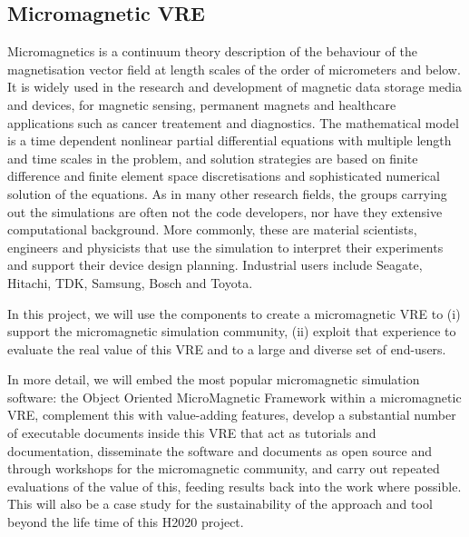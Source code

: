\subsection{Micromagnetic VRE}
Micromagnetics is a continuum theory description of the behaviour of
the magnetisation vector field at length scales of the order of
micrometers and below. It is widely used in the research and
development of magnetic data storage media and devices, for magnetic
sensing, permanent magnets and healthcare applications such as cancer
treatement and diagnostics. The mathematical model is a time dependent
nonlinear partial differential equations with multiple length and time
scales in the problem, and solution strategies are based on finite
difference and finite element space discretisations and sophisticated
numerical solution of the equations. As in many other research fields,
the groups carrying out the simulations are often not the code
developers, nor have they extensive computational background. More
commonly, these are material scientists, engineers and physicists that
use the simulation to interpret their experiments and support their
device design planning. Industrial users include Seagate, Hitachi,
TDK, Samsung, Bosch and Toyota.

In this project, we will use the \TheProject components to create a
micromagnetic VRE to (i) support the micromagnetic simulation
community, (ii) exploit that experience to evaluate the real value of
this VRE and \TheProject to a large and diverse set of end-users. 

In more detail, we will embed the most popular micromagnetic
simulation software: the Object Oriented MicroMagnetic Framework
\cite{oommf-url} within a micromagnetic VRE, complement this with
value-adding features, develop a substantial number of executable
documents inside this VRE that act as tutorials and documentation,
disseminate the software and documents as open source and through
workshops for the micromagnetic community, and carry out repeated
evaluations of the value of this, feeding results back into the
\TheProject work where possible. This will also be a case study for
the sustainability of the approach and tool beyond the life time of
this H2020 project.



